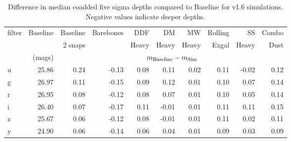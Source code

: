 \begin{table}
\begin{centering}
\begin{tabular}{lrrrrrrrrr}
\toprule
filter &  Baseline &  Baseline &  Barebones &  DDF  &  DM  &  MW  &  Rolling  &  SS  &  Combo  \\
 & & 2 snaps & & Heavy & Heavy & Heavy & Exgal & Heavy & Dust \\
 & (mags) &  \multicolumn{8}{c}{$m_{\rm{Baseline}} - m_{\rm{Sim}}$} \\ 
\hline
     u &     25.86 &              0.24 &      -0.13 &       0.08 &      0.11 &      0.02 &           0.11 &     -0.02 &        0.12 \\
     g &     26.97 &              0.11 &      -0.15 &       0.09 &      0.12 &      0.01 &           0.10 &      0.07 &        0.14 \\
     r &     26.95 &              0.08 &      -0.12 &       0.08 &      0.07 &      0.01 &           0.10 &      0.05 &        0.14 \\
     i &     26.40 &              0.07 &      -0.17 &       0.11 &     -0.01 &      0.01 &           0.11 &      0.11 &        0.15 \\
     z &     25.67 &              0.06 &      -0.12 &       0.08 &     -0.01 &      0.01 &           0.11 &      0.02 &        0.11 \\
     y &     24.90 &              0.06 &      -0.14 &       0.06 &      0.04 &      0.01 &           0.09 &      0.03 &        0.09 \\
\end{tabular}
\caption{Difference in median coadded five sigma depths compared to Baseline for v1.6 simulations. Negative values indicate deeper depths.}\label{table:depths}
\end{centering}
\end{table}

